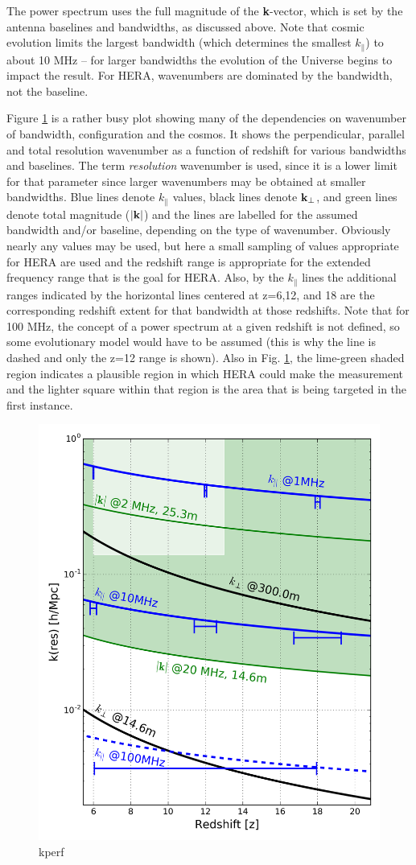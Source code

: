 \documentclass[preprint,11pt]{aastex}
\newcommand{\kvec}{{\bf k}}
\newcommand{\kvpr}{{\kvec_\perp}}
\def\kpar{k_{\|}}
\begin{document}
The power spectrum uses the full magnitude of the {\bf k}-vector, which is set by the antenna baselines and bandwidths, as discussed above.  Note that cosmic evolution limits the largest bandwidth (which determines the smallest $\kpar$) to about 10 MHz -- for larger bandwidths the evolution of the Universe begins to impact the result.  For HERA, wavenumbers are dominated by the bandwidth, not the baseline.

Figure \ref{fig:kperf} is a rather busy plot showing many of the dependencies on wavenumber of bandwidth, configuration and the cosmos.  It shows the perpendicular, parallel and total resolution wavenumber as a function of redshift for various bandwidths and baselines.  The term {\em resolution} wavenumber is used, since it is a lower limit for that parameter since larger wavenumbers may be obtained at smaller bandwidths.  Blue lines denote $\kpar$ values, black lines denote $\kvpr$, and green lines denote total magnitude ($|{\bf k}|$) and the lines are labelled for the assumed bandwidth and/or baseline, depending on the type of wavenumber.  Obviously nearly any values may be used, but here a small sampling of values appropriate for HERA are used and the redshift range is appropriate for the extended frequency range that is the goal for HERA.  Also, by the $\kpar$ lines the additional ranges indicated by the horizontal lines centered at z=6,12, and 18 are the corresponding redshift extent for that bandwidth at those redshifts.  Note that for 100 MHz, the concept of a power spectrum at a given redshift is not defined, so some evolutionary model would have to be assumed (this is why the line is dashed and only the z=12 range is shown).
Also in Fig. \ref{fig:kperf}, the lime-green shaded region indicates a plausible region in which HERA could make the measurement and the lighter square within that region is the area that is being targeted in the first instance.


\begin{figure}[h!]
\centerline{
\includegraphics[width=.4\textwidth]{plots/kperf.png} 
}
\caption{\small kperf}
\label{fig:kperf}
\end{figure}
\end{document}

